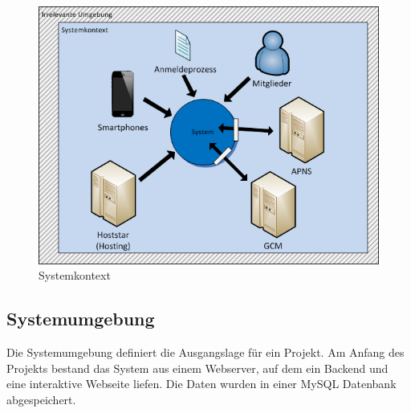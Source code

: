 \cite{req_eng_book} 
\begin{figure}[h]
\centering
\includegraphics[scale=0.8]{images/visio/systemkontext.png}
\caption{Systemkontext}
\label{fig:systemkontext}
\end{figure}

\FloatBarrier
\subsection{Systemumgebung}\label{systemumgebung}
Die Systemumgebung definiert die Ausgangslage für ein Projekt. Am Anfang des Projekts bestand das System aus einem Webserver, auf dem ein  Backend und eine interaktive Webseite liefen. Die Daten wurden in einer MySQL Datenbank abgespeichert. 

